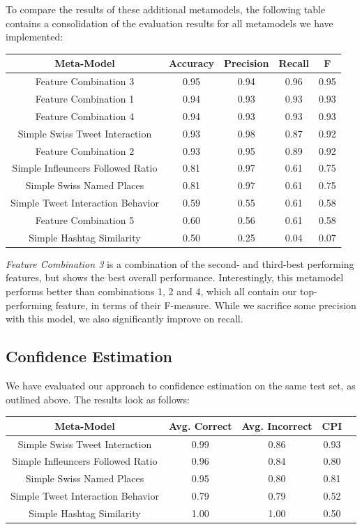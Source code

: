 \documentclass[10pt,a4paper]{article}
\begin{document}
To compare the results of these additional metamodels, the following table contains a consolidation of the evaluation results for all metamodels we have implemented:

\begin{center}
\begin{tabular}{ |c|c|c|c|c| }
\hline
\textbf{Meta-Model} & \textbf{Accuracy} & \textbf{Precision} & \textbf{Recall} & \textbf{F} \\
\hline
Feature Combination 3 & 0.95 & 0.94 & 0.96 & 0.95 \\
\hline
Feature Combination 1 & 0.94 & 0.93 & 0.93 & 0.93 \\
\hline
Feature Combination 4 & 0.94 & 0.93 & 0.93 & 0.93 \\
\hline
Simple Swiss Tweet Interaction & 0.93 & 0.98 & 0.87 & 0.92 \\
\hline
Feature Combination 2 & 0.93 & 0.95 & 0.89 & 0.92 \\
\hline
Simple Infleuncers Followed Ratio & 0.81 & 0.97 & 0.61 & 0.75 \\
\hline
Simple Swiss Named Places & 0.81 & 0.97 & 0.61 & 0.75 \\
\hline
Simple Tweet Interaction Behavior & 0.59 & 0.55 & 0.61 & 0.58 \\
\hline
Feature Combination 5 & 0.60 & 0.56 & 0.61 & 0.58 \\
\hline
Simple Hashtag Similarity & 0.50 & 0.25 & 0.04 & 0.07 \\
\hline
\end{tabular}
\end{center}

\textit{Feature Combination 3} is a combination of the second- and third-best performing features, but shows the best overall performance. Interestingly, this metamodel performs better than combinations 1, 2 and 4, which all contain our top-performing feature, in terms of their F-measure. While we sacrifice some precision with this model, we also significantly improve on recall.

\subsection{Confidence Estimation}
We have evaluated our approach to confidence estimation on the same test set, as outlined above. The results look as follows:

\begin{center}
\begin{tabular}{ |c|c|c|c|c| }
\hline
\textbf{Meta-Model} & \textbf{Avg. Correct} & \textbf{Avg. Incorrect} & \textbf{CPI} \\
\hline
Simple Swiss Tweet Interaction & 0.99 & 0.86 & 0.93 \\
\hline
Simple Infleuncers Followed Ratio & 0.96 & 0.84 & 0.80 \\
\hline
Simple Swiss Named Places & 0.95 & 0.80 & 0.81 \\
\hline
\hline
Simple Tweet Interaction Behavior & 0.79 & 0.79 & 0.52 \\
\hline
Simple Hashtag Similarity & 1.00 & 1.00 & 0.50 \\
\hline
\end{tabular}
\end{center}
\end{document}
